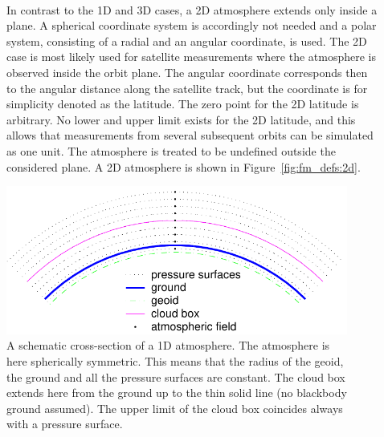 \begin{description}
\item[\,\,\,] In contrast to the 1D and 3D cases, a 2D
  atmosphere extends only inside a plane. A spherical coordinate
  system is accordingly not needed and a polar system, consisting of a radial and an angular
  coordinate, is used. The 2D case is most likely used for satellite
  measurements where the atmosphere is observed inside the orbit
  plane. The angular coordinate corresponds then to the angular
  distance along the satellite track, but the coordinate is for
  simplicity denoted as the latitude. The zero point for the 2D
  latitude is arbitrary. No lower and upper limit exists for the 2D
  latitude, and this allows that measurements from several subsequent
  orbits can be simulated as one unit. The atmosphere is treated to be
  undefined outside the considered plane. A 2D atmosphere is shown in
  Figure~\ref{fig:fm_defs:2d}.

\end{description}

\begin{figure}[!t]
 \begin{center}
  \includegraphics*[width=0.95\hsize]{Figs/fm_definitions/atm_dim_1d}
  \caption{A schematic cross-section of a 1D atmosphere. The atmosphere is 
    here spherically symmetric. This means that the radius of the
    geoid, the ground and all the pressure surfaces are constant. The
    cloud box extends here from the ground up to the thin solid line
    (no blackbody ground assumed). The upper limit of the cloud box
    coincides always with a pressure surface. }
  \label{fig:fm_defs:1d}  
 \end{center}
\end{figure}

